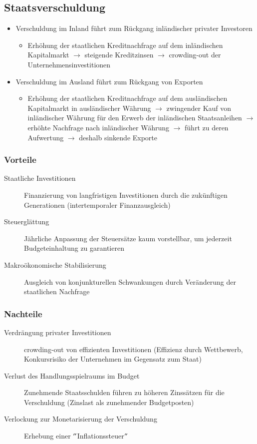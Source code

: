 \subsection{Staatsverschuldung}
\begin{itemize}
	\item Verschuldung im Inland führt zum Rückgang inländischer privater Investoren
	\begin{itemize}
		\item Erhöhung der staatlichen Kreditnachfrage auf dem inländischen Kapitalmarkt $\rightarrow$ steigende Kreditzinsen $\rightarrow$ crowding-out der Unternehmensinvestitionen
	\end{itemize}
	\item Verschuldung im Ausland führt zum Rückgang von Exporten
	\begin{itemize}
		\item Erhöhung der staatlichen Kreditnachfrage auf dem ausländischen Kapitalmarkt in ausländischer Währung $\rightarrow$ zwingender Kauf von inländischer Währung für den Erwerb der inländischen Staatsanleihen $\rightarrow$ erhöhte Nachfrage nach inländischer Währung $\rightarrow$ führt zu deren Aufwertung $\rightarrow$ deshalb sinkende Exporte
	\end{itemize}
\end{itemize}
\begin{multicols}{2}
	\subsubsection{Vorteile}
	\begin{description}
		\item[Staatliche Investitionen] Finanzierung von langfristigen Investitionen durch die zukünftigen Generationen (intertemporaler Finanzausgleich)
		\item[Steuerglättung] Jährliche Anpassung der Steuersätze kaum vorstellbar, um jederzeit Budgeteinhaltung zu garantieren
		\item[Makroökonomische Stabilisierung] Ausgleich von konjunkturellen Schwankungen durch Veränderung der staatlichen Nachfrage
	\end{description}
	\vfill\null
	\columnbreak
	\subsubsection{Nachteile}
	\begin{description}
		\item[Verdrängung privater Investitionen] crowding-out von effizienten Investitionen (Effizienz durch Wettbewerb, Konkursrisiko der Unternehmen im Gegensatz zum Staat)
		\item[Verlust des Handlungsspielraums im Budget] Zunehmende Staatsschulden führen zu höheren Zinssätzen für die Verschuldung (Zinslast als zunehmender Budgetposten)
		\item[Verlockung zur Monetarisierung der Verschuldung] Erhebung einer $"$Inflationssteuer$"$
	\end{description}
	\vfill\null
\end{multicols}
